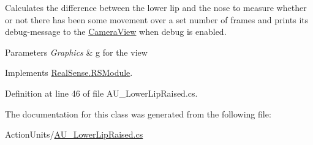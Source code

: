 Calculates the difference between the lower lip and the nose to measure whether or not there has been some movement over a set number of frames and prints its\textquotesingle{} debug-\/message to the \hyperlink{class_real_sense_1_1_camera_view}{Camera\+View} when debug is enabled. 
\begin{DoxyParams}{Parameters}
{\em Graphics} & g for the view \\
\hline
\end{DoxyParams}


Implements \hyperlink{class_real_sense_1_1_r_s_module_a2ec830b7932ee7c0077d473f81c73867}{Real\+Sense.\+R\+S\+Module}.



Definition at line 46 of file A\+U\+\_\+\+Lower\+Lip\+Raised.\+cs.



The documentation for this class was generated from the following file\+:\begin{DoxyCompactItemize}
\item 
Action\+Units/\hyperlink{_a_u___lower_lip_raised_8cs}{A\+U\+\_\+\+Lower\+Lip\+Raised.\+cs}\end{DoxyCompactItemize}
